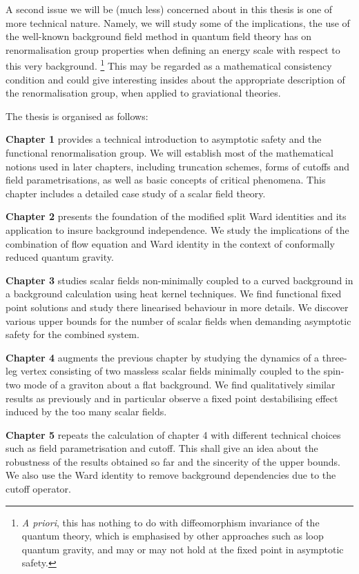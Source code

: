 \documentclass[11pt]{book}
\numberwithin{equation}{chapter}
\begin{document}
A second issue we will be (much less) concerned about in this thesis is one of
more technical nature. Namely, we will study some of the implications, the use
of the well-known background field method in quantum field theory has on renormalisation
group properties when defining an energy scale with respect to this very background.%
\footnote{%
  \textit{A priori}, this has nothing to do with diffeomorphism invariance of
  the quantum theory, which is emphasised by other approaches such as loop quantum gravity,
  and may or may not hold at the fixed point in asymptotic safety.
}
This may be regarded as a mathematical consistency condition and could give
interesting insides about the appropriate description of the renormalisation group,
when applied to graviational theories.

\bigskip
\noindent
The thesis is organised as follows:

\medskip
\textbf{Chapter 1} provides a technical introduction to asymptotic safety and the
functional renormalisation group. We will establish most of the mathematical notions
used in later chapters, including truncation schemes, forms of cutoffs and field
parametrisations, as well as basic concepts of critical phenomena. This chapter includes
a detailed case study of a scalar field theory.

\medskip
\textbf{Chapter 2} presents the foundation of the modified split Ward identities and
its application to insure background independence. We study the implications of the
combination of flow equation and Ward identity in the context of conformally reduced
quantum gravity.

\medskip
\textbf{Chapter 3} studies scalar fields non-minimally coupled to a curved background
in a background calculation using heat kernel techniques. We find functional fixed point
solutions and study there linearised behaviour in more details. We discover various
upper bounds for the number of scalar fields when demanding asymptotic safety for
the combined system.

\medskip
\textbf{Chapter 4} augments the previous chapter by studying the dynamics
of a three-leg vertex consisting of two massless scalar fields minimally coupled to
the spin-two mode of a graviton about a flat background.
We find qualitatively similar results as previously and in particular observe
a fixed point destabilising effect induced by the too many scalar fields.

\medskip
\textbf{Chapter 5} repeats the calculation of chapter 4 with different technical choices
such as field parametrisation and cutoff. This shall give an idea about the
robustness of the results obtained so far and the sincerity of the upper bounds.
We also use the Ward identity to remove background dependencies due to the
cutoff operator.
\end{document}
